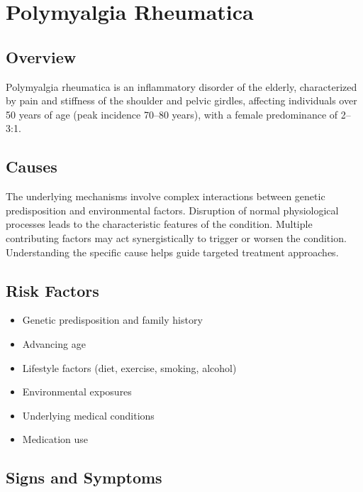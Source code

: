 \chapter{Polymyalgia Rheumatica}
\label{sec:Polymyalgia Rheumatica}

\section{Overview}
Polymyalgia rheumatica is an inflammatory disorder of the elderly, characterized by pain and stiffness of the shoulder and pelvic girdles, affecting individuals over 50 years of age (peak incidence 70--80 years), with a female predominance of 2--3:1.
\section{Causes}
The underlying mechanisms involve complex interactions between genetic predisposition and environmental factors. Disruption of normal physiological processes leads to the characteristic features of the condition. Multiple contributing factors may act synergistically to trigger or worsen the condition. Understanding the specific cause helps guide targeted treatment approaches.
\section{Risk Factors}


\begin{itemize}[noitemsep]
  \item Genetic predisposition and family history
  \item Advancing age
  \item Lifestyle factors (diet, exercise, smoking, alcohol)
  \item Environmental exposures
  \item Underlying medical conditions
  \item Medication use
\end{itemize}
\section{Signs and Symptoms}

